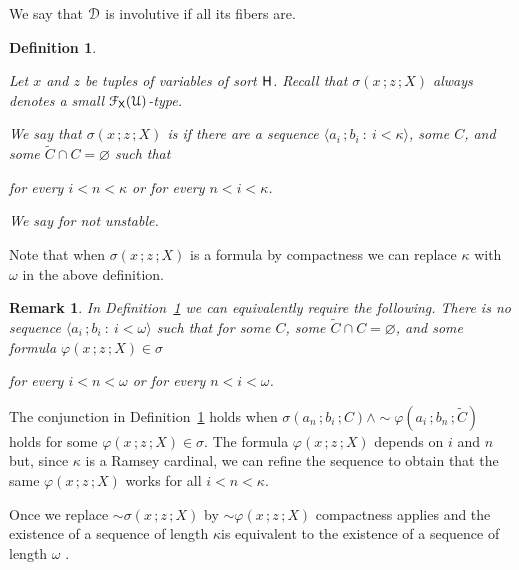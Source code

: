 \documentclass{amsproc}
\makeatletter
\newcounter{thm}
\theoremstyle{mio}
\newtheorem{definition}[thm]{Definition}\tcolorboxenvironment{definition}{mythm}
\newtheorem{remark}[thm]{Remark}\tcolorboxenvironment{remark}{mythm}
\providecommand{\proofNameStyle}{\bfseries}
\renewenvironment{proof}[1][\proofname]{\par
  \pushQED{\qed}%
  \normalfont%
  \trivlist
  \item[\hskip\labelsep
        \proofNameStyle
    #1\@addpunct{.}]\ignorespaces
}{%
  \popQED\endtrivlist\@endpefalse
}
\renewcommand*{\emph}[1]{%
   \smash{\tikz[baseline]\node[rectangle, fill=teal!25, rounded corners, inner xsep=0.5ex, inner ysep=0.2ex, anchor=base, minimum height = 2.7ex]{\strut #1};}}
\makeatother
\begin{document}

We say that ${\EuScript D}$ is involutive if all its fibers are.


\begin{definition}\label{def_stable}\strut
  Let $x$ and $z$ be tuples of variables of sort ${\sf H}$.
  Recall that $\sigma(x\,;z\,;X)$ always denotes a small ${\EuScript F}_{\sf X}({\EuScript U})$-type.\smallskip

  We say that $\sigma(x\,;z\,;X)$ is \emph{unstable\/} if there are a sequence $\langle a_i\,;b_i\ :\ i<\kappa\rangle$, some $C$, and some $\tilde C\cap C=\varnothing$ such that\smallskip

  \hfill for every $i<n<\kappa$ or for every $n<i<\kappa$.\smallskip

  We say \emph{stable\/} for not unstable.    
\end{definition}

Note that when $\sigma(x\,;z\,;X)$ is a formula by compactness we can replace $\kappa$ with $\omega$ in the above definition.

\begin{remark}\label{rem_stable}
  In Definition~\ref{def_stable} we can equivalently require the following.
  There is no sequence $\langle a_i\,;b_i\ :\ i<\omega\rangle$ such that for some $C$, some $\tilde C\cap C=\varnothing$, and some formula $\varphi(x\,;z\,;X)\in\sigma$\smallskip

  \hfill for every $i<n<\omega$ or for every $n<i<\omega$.\smallskip
\end{remark}

\begin{proof}
  The conjunction in Definition~\ref{def_stable} holds when
  $\sigma(a_n\,;b_i\,;C)\wedge{\sim}\varphi(a_i\,;b_n\,;\tilde C)$
  holds for some $\varphi(x\,;z\,;X)\in\sigma$.
  The formula $\varphi(x\,;z\,;X)$ depends on $i$ and $n$ but, since $\kappa$ is a Ramsey cardinal, we can refine the sequence to obtain that the same $\varphi(x\,;z\,;X)$ works for all $i<n<\kappa$.

  Once we replace ${\sim}\sigma(x\,;z\,;X)$ by ${\sim}\varphi(x\,;z\,;X)$ compactness applies and the existence of a sequence of length $\kappa$is equivalent to the existence of a sequence of length $\omega$ .
\end{proof}
\end{document}
